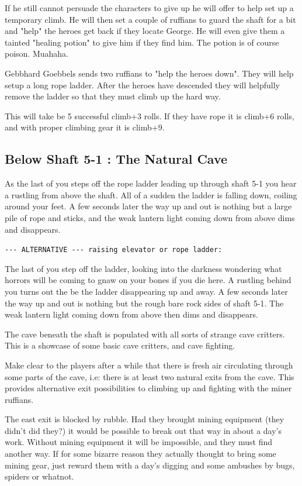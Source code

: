 If he still cannot persuade the characters to give up he will offer to help set up a temporary climb. He will then set a couple of ruffians to guard the shaft for a bit and "help" the heroes get back if they locate George. He will even give them a tainted "healing potion" to give him if they find him. The potion is of course poison. Muahaha.

Gebbhard Goebbels sends two ruffians to "help the heroes down". They will help setup a long rope ladder. After the heroes have descended they will helpfully remove the ladder so that they must climb up the hard way.

This will take be 5 successful climb+3 rolls. If they have rope it is climb+6 rolls, and with proper climbing gear it is climb+9.


\subsection*{Below Shaft 5-1 : The Natural Cave}
\begin{readoutloud}
As the last of you steps off the rope ladder leading up through shaft 5-1 you hear a rustling from above the shaft. All of a sudden the ladder is falling down, coiling around your feet. A few seconds later the way up and out is nothing but a large pile of rope and sticks, and the weak lantern light coming down from above dims and disappears.

\verb|--- ALTERNATIVE --- raising elevator or rope ladder:|

The last of you step off the ladder, looking into the darkness wondering what horrors will be coming to gnaw on your bones if you die here. A rustling behind you turns out the be the ladder disappearing up and away. A few seconds later the way up and out is nothing but the rough bare rock sides of shaft 5-1. The weak lantern light coming down from above then dims and disappears.
\end{readoutloud}

The cave beneath the shaft is populated with all sorts of strange cave critters.
This is a showcase of some basic cave critters, and cave fighting.

Make clear to the players after a while that there is fresh air circulating through some parts of the cave, i.e: there is at least two natural exits from the cave. This provides alternative exit possibilities to climbing up and fighting with the miner ruffians.

The east exit is blocked by rubble. Had they brought mining equipment (they didn't did they?) it would be possible to break out that way in about a day's work. Without mining equipment it will be impossible, and they must find another way. If for some bizarre reason they actually thought to bring some mining gear, just reward them with a day's digging and some ambushes by bugs, spiders or whatnot.

